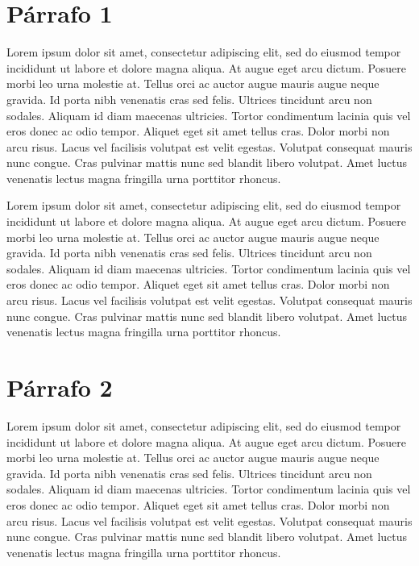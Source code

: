 \section{Párrafo 1}
Lorem ipsum dolor sit amet, consectetur adipiscing elit, sed do eiusmod tempor incididunt ut labore et dolore magna aliqua. At augue eget arcu dictum. Posuere morbi leo urna molestie at. Tellus orci ac auctor augue mauris augue neque gravida. Id porta nibh venenatis cras sed felis. Ultrices tincidunt arcu non sodales. Aliquam id diam maecenas ultricies. Tortor condimentum lacinia quis vel eros donec ac odio tempor. Aliquet eget sit amet tellus cras. Dolor morbi non arcu risus. Lacus vel facilisis volutpat est velit egestas. Volutpat consequat mauris nunc congue. Cras pulvinar mattis nunc sed blandit libero volutpat. Amet luctus venenatis lectus magna fringilla urna porttitor rhoncus.

Lorem ipsum dolor sit amet, consectetur adipiscing elit, sed do eiusmod tempor incididunt ut labore et dolore magna aliqua. At augue eget arcu dictum. Posuere morbi leo urna molestie at. Tellus orci ac auctor augue mauris augue neque gravida. Id porta nibh venenatis cras sed felis. Ultrices tincidunt arcu non sodales. Aliquam id diam maecenas ultricies. Tortor condimentum lacinia quis vel eros donec ac odio tempor. Aliquet eget sit amet tellus cras. Dolor morbi non arcu risus. Lacus vel facilisis volutpat est velit egestas. Volutpat consequat mauris nunc congue. Cras pulvinar mattis nunc sed blandit libero volutpat. Amet luctus venenatis lectus magna fringilla urna porttitor rhoncus.

\section{Párrafo 2}
Lorem ipsum dolor sit amet, consectetur adipiscing elit, sed do eiusmod tempor incididunt ut labore et dolore magna aliqua. At augue eget arcu dictum. Posuere morbi leo urna molestie at. Tellus orci ac auctor augue mauris augue neque gravida. Id porta nibh venenatis cras sed felis. Ultrices tincidunt arcu non sodales. Aliquam id diam maecenas ultricies. Tortor condimentum lacinia quis vel eros donec ac odio tempor. Aliquet eget sit amet tellus cras. Dolor morbi non arcu risus. Lacus vel facilisis volutpat est velit egestas. Volutpat consequat mauris nunc congue. Cras pulvinar mattis nunc sed blandit libero volutpat. Amet luctus venenatis lectus magna fringilla urna porttitor rhoncus.	

